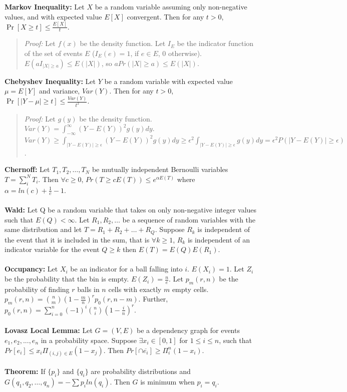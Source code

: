 {\bf Markov Inequality:} Let $X$ be a random variable assuming only non-negative values, and
with expected value $E[X]$ convergent.  Then
for any $t>0$,
$ \Pr[X \geq t] \leq \frac{E[X]}{t}.$
\begin{quote}
\emph{Proof:}
Let $f(x)$ be the density function. Let $I_E$ be the indicator function of the
set of events $E$ ($I_E(e)= 1$, if $e \in E$, $0$ otherwise).
$E(aI_{|X| \geq a}) \leq E(|X|)$, so $aPr(|X| \geq a) \leq E(|X|)$.
\end{quote}
{\bf Chebyshev Inequality:} Let $Y$ be a random variable
with expected value $\mu = E[Y]$ and variance, $Var(Y)$.  Then
for any $t>0$,
$\Pr[| Y - \mu | \geq t] \leq {\frac {Var(Y)}{t^2}}.$
\begin{quote}
\emph{Proof:}
Let $g(y)$ be the density function. 
$Var(Y)= \int_{-\infty}^{\infty} (Y-E(Y))^2 g(y) dy$.
$Var(Y) \geq 
\int_{|Y-E(Y)| \geq \epsilon} (Y-E(Y))^2 g(y) dy \geq \epsilon^2 
\int_{|Y-E(Y)| \geq \epsilon} g(y) dy = \epsilon^2 P(|Y-E(Y)| \geq \epsilon)$.
\end{quote}
{\bf Chernoff:} Let $T_1 , T_2 , \ldots , T_N$ be mutually independent Bernoulli
variables
$T= \sum_i^N T_i$.  Then $\forall c \geq 0$,
$Pr( T \geq c E(T)) \leq e^{\alpha E(T)}$ where
$\alpha = ln(c) + {\frac 1 c} -1$.
\\
\\
{\bf Wald:} Let Q be a random variable that takes on only non-negative integer
values such
that $E(Q) < \infty$.  Let $R_1 , R_2 , \ldots$ be a sequence of random
variables
with the same distribution and let $T= R_1 + R_2 + \ldots + R_Q$.  Suppose
$R_k$ is independent of the event that it is included in the sum, that is
$\forall
k \geq 1$, $R_k$ is independent of an indicator variable for the event
$Q \geq k$ then $E(T)= E(Q) E(R_1 )$.
\\
\\
{\bf Occupancy:} Let $X_i$ be an indicator for a ball falling into $i$. $E(X_i ) =
1$.
Let $Z_i$ be the probability that the bin is empty. $E(Z_i )= {\frac {n}
{e}}$.
Let $p_m (r, n)$ be the probability of finding $r$ balls in $n$ cells with exactly
$m$ empty cells.
$p_m (r, n)= {n \choose m} (1- {\frac m n})^r p_0 (r, n-m)$.  Further,
$p_0 (r, n)= \sum_{i=0}^{n} (-1)^i {n \choose i} (1- {\frac i n})^r$.
\\
\\
{\bf Lovasz Local Lemma:}  Let $G= (V,E)$ be a dependency graph for events $e_1 ,
e_2 , ... , e_n$
in a probability space.  Suppose $\exists x_i \in
[0, 1]$ for $1 \leq i \leq n$, such that
$Pr[e_i ] \leq x_i \Pi_{(i, j) \in E} (1 - x_j )$.  Then
$Pr[\cap {\overline {e_i}}] \geq  \Pi_{i}^{n} (1- x_i )$.
\\
\\
{\bf Theorem:}
If $\{p_i \}$ and $\{ q_i \}$ are probability distributions and
$G(q_1 , q_2 , \ldots , q_n ) = - \sum p_i ln(q_i )$. Then $G$ is minimum
when
$p_i = q_i$.
